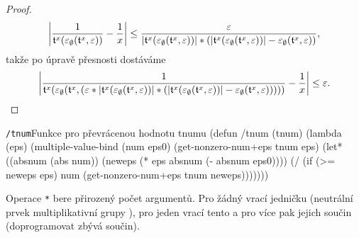\begin{theorem}
\begin{proof}
\begin{equation}
\left|\frac{1}{\mathfrak{t}^{x}(\varepsilon_\emptyset(\mathfrak{t}^{x}, \varepsilon))}-\frac{1}{x}\right|\leq \frac{\varepsilon}{|\mathfrak{t}^{x}(\varepsilon_\emptyset(\mathfrak{t}^{x}, \varepsilon))|*(|\mathfrak{t}^{x}(\varepsilon_\emptyset(\mathfrak{t}^{x}, \varepsilon))|-\varepsilon_\emptyset(\mathfrak{t}^{x}, \varepsilon))},
\end{equation}
takže po úpravě přesnosti dostáváme
\begin{equation}
\left|\frac{1}{\mathfrak{t}^{x}(\varepsilon_\emptyset(\mathfrak{t}^{x}, (\varepsilon * |\mathfrak{t}^{x}(\varepsilon_\emptyset(\mathfrak{t}^{x}, \varepsilon))|*(|\mathfrak{t}^{x}(\varepsilon_\emptyset(\mathfrak{t}^{x}, \varepsilon))|-\varepsilon_\emptyset(\mathfrak{t}^{x}, \varepsilon)))))}-\frac{1}{x}\right|\leq \varepsilon.
\end{equation}
\end{proof}
\end{theorem}

\begin{lispcode}{\texttt{/tnum}}{Funkce pro převrácenou hodnotu tnumu}
(\textcolor{funkcionalni}{defun} \textcolor{pojmenovan}{/tnum} (tnum)
  (\textcolor{funkcionalni}{lambda} (eps)
    (\textcolor{matematicke}{multiple-value-bind} (num eps0)
        (\textcolor{moje}{get-nonzero-num+eps} tnum eps)
      (\textcolor{vedlejsi}{let*} ((absnum (\textcolor{matematicke}{abs} num))
             (neweps (\textcolor{matematicke}{*} eps absnum (\textcolor{matematicke}{-} absnum eps0))))
        (\textcolor{matematicke}{/} (\textcolor{funkcionalni}{if} (\textcolor{matematicke}{>=} neweps eps) num
             (\textcolor{moje}{get-nonzero-num+eps} tnum neweps)))))))
\end{lispcode}

Operace \texttt{*} bere přirozený počet argumentů. Pro žádný vrací jedničku (neutrální prvek multiplikativní grupy \cite{RachALG1}), pro jeden vrací tento a pro více pak jejich součin (doprogramovat zbývá součin).

